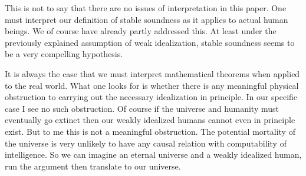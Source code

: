 \documentclass{amsart}  %
\numberwithin{equation}{section}
\theoremstyle{definition}
\theoremstyle{remark}
\begin{document}
{%
This is not to say that there are no issues of interpretation in this paper.  One must interpret our definition of stable soundness as it applies to actual human beings. We of course have already partly addressed this. At least under the previously explained assumption of weak idealization, stable soundness seems to be a very compelling hypothesis.

It is always the case that we must interpret mathematical theorems when applied to the real world. What one looks for is whether there is any meaningful physical obstruction to carrying out the necessary idealization in principle. In our specific case I see no such obstruction. 
Of course if the universe and humanity must eventually go extinct then our weakly idealized humans cannot even in principle exist. But to me this is not a meaningful obstruction. The potential mortality of the universe is very unlikely to have any causal relation with computability of intelligence. So we can imagine an eternal universe and a weakly idealized human, run the argument then translate to our universe.
}
\end{document}
